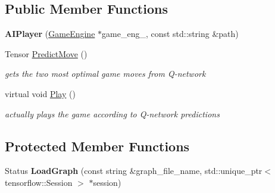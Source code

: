 \subsection*{Public Member Functions}
\begin{DoxyCompactItemize}
\item 
{\bfseries A\+I\+Player} (\hyperlink{class_game_engine}{Game\+Engine} $\ast$game\+\_\+eng\+\_\+, const std\+::string \&path)\hypertarget{class_a_i_player_aa75e6656a876ae0d4dc1502754d883ac}{}\label{class_a_i_player_aa75e6656a876ae0d4dc1502754d883ac}

\item 
Tensor \hyperlink{class_a_i_player_ad7462ee157edc5701c3f4534159ab54b}{Predict\+Move} ()
\begin{DoxyCompactList}\small\item\em gets the two most optimal game moves from Q-\/network \end{DoxyCompactList}\item 
virtual void \hyperlink{class_a_i_player_a0a82287b3e1353b58c5dc79d099ab4a6}{Play} ()\hypertarget{class_a_i_player_a0a82287b3e1353b58c5dc79d099ab4a6}{}\label{class_a_i_player_a0a82287b3e1353b58c5dc79d099ab4a6}

\begin{DoxyCompactList}\small\item\em actually plays the game according to Q-\/network predictions \end{DoxyCompactList}\end{DoxyCompactItemize}
\subsection*{Protected Member Functions}
\begin{DoxyCompactItemize}
\item 
Status {\bfseries Load\+Graph} (const string \&graph\+\_\+file\+\_\+name, std\+::unique\+\_\+ptr$<$ tensorflow\+::\+Session $>$ $\ast$session)\hypertarget{class_a_i_player_aac8bd4a862ce36c2baa28ecb363732b4}{}\label{class_a_i_player_aac8bd4a862ce36c2baa28ecb363732b4}

\end{DoxyCompactItemize}
